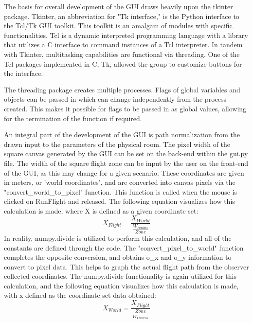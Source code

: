\documentclass[conf]{new-aiaa}
\begin{document}
        The basis for overall development of the GUI draws heavily upon the tkinter package. Tkinter, an abbreviation for "Tk interface," is the Python interface to the Tcl/Tk GUI toolkit. This toolkit is an amalgam of modules with specific functionalities. Tcl is a dynamic interpreted programming language with a library that utilizes a C interface to command instances of a Tcl interpreter. In tandem with Tkinter, multitasking capabilities are functional via threading. One of the Tcl packages implemented in C, Tk, allowed the group to customize buttons for the interface.
        
        The threading package creates multiple processes. Flags of global variables and objects can be passed in which can change independently from the process created. This makes it possible for flags to be passed in as global values, allowing for the termination of the function if required. 
        
        An integral part of the development of the GUI is path normalization from the drawn input to the parameters of the physical room. The pixel width of the square canvas generated by the GUI can be set on the back-end within the gui.py file. The width of the square flight zone can be input by the user on the front-end of the GUI, as this may change for a given scenario. These coordinates are given in meters, or 'world coordinates', and are converted into canvas pixels via the "convert\_world\_to\_pixel" function. This function is called when the mouse is clicked on RunFlight and released. The following equation visualizes how this calculation is made, where X is defined as a given coordinate set:
        \begin{equation}
            X_{Flight} = \frac{X_{World}}{\frac{W_{canvas}}{Zone}}
        \end{equation}
        In reality, numpy.divide is utilized to perform this calculation, and all of the constants are defined through the code. The "convert\_pixel\_to\_world" function completes the opposite conversion, and obtains o\_x and o\_y information to convert to pixel data. This helps to graph the actual flight path from the observer collected coordinates. The numpy.divide functionality is again utilized for this calculation, and the following equation visualizes how this calculation is made, with x defined as the coordinate set data obtained:
        \begin{equation}
            X_{World} = \frac{X_{Flight}}{\frac{Zone}{W_{Canvas}}}
        \end{equation}
        
\end{document}
